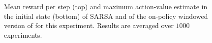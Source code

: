 \documentclass[conference]{IEEEtran}
\begin{document}
\begin{figure}[t]
\begin{minipage}{\columnwidth}
\centering
  \hspace{-.5cm}
\end{minipage}
  \caption{Mean reward per step (top) and maximum action-value estimate in the initial state (bottom) of SARSA and of the on-policy windowed version of \alg for this experiment. Results are averaged over $1000$ experiments.}
  \label{F:sarsa}
\end{figure}
\end{document}
